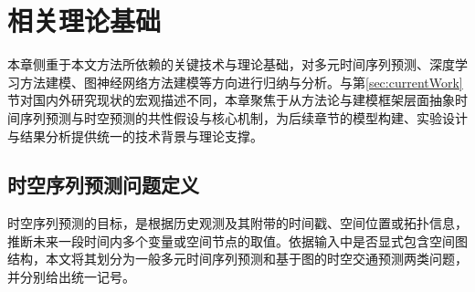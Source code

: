 \chapter{相关理论基础}
本章侧重于本文方法所依赖的关键技术与理论基础，对多元时间序列预测、深度学习方法建模、图神经网络方法建模等方向进行归纳与分析。与第\ref{sec:currentWork}节对国内外研究现状的宏观描述不同，本章聚焦于从方法论与建模框架层面抽象时间序列预测与时空预测的共性假设与核心机制，为后续章节的模型构建、实验设计与结果分析提供统一的技术背景与理论支撑。

\section{时空序列预测问题定义}

时空序列预测的目标，是根据历史观测及其附带的时间戳、空间位置或拓扑信息，推断未来一段时间内多个变量或空间节点的取值。依据输入中是否显式包含空间图结构，本文将其划分为一般多元时间序列预测和基于图的时空交通预测两类问题，并分别给出统一记号。

